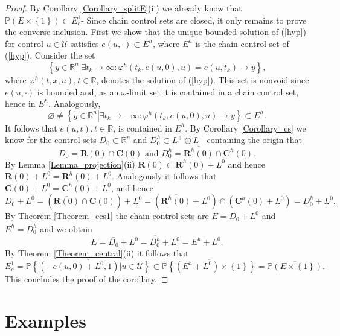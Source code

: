 \documentclass{siamltex}%
\begin{document}
\begin{proof}
By Corollary \ref{Corollary_splitE}(ii) we already know that $\mathbb{P}%
(E\times\left\{  1\right\}  )\subset E_{c}^{1}$- Since chain control sets are
closed, it only remains to prove the converse inclusion. First we show that
the unique bounded solution of (\ref{hyp}) for control $u\in\mathcal{U}$
satisfies $e(u,\cdot)\subset E^{h}$, where $E^{h}$ is the chain control set of
(\ref{hyp}). Consider the set%
\[
\left\{  y\in\mathbb{R}^{n}\left\vert \exists t_{k}\rightarrow\infty
:\varphi^{h}(t_{k},e(u,0),u)=e(u,t_{k})\rightarrow y\right.  \right\}  ,
\]
where $\varphi^{h}(t,x,u),t\in\mathbb{R}$, denotes the solution of
(\ref{hyp}). This set is nonvoid since $e(u,\cdot)$ is bounded and, as an
$\omega$-limit set it is contained in a chain control set, hence in $E^{h}$.
Analogously,%
\[
\varnothing\not =\left\{  y\in\mathbb{R}^{n}\left\vert \exists t_{k}%
\rightarrow-\infty:\varphi^{h}(t_{k},e(u,0),u)\rightarrow y\right.  \right\}
\subset E^{h}.
\]
It follows that $e(u,t),t\in\mathbb{R}$, is contained in $E^{h}$. By Corollary
\ref{Corollary_cs} we know for the control sets $D_{0}\subset\mathbb{R}^{n}$
and $D_{0}^{h}\subset L^{+}\oplus L^{-}$ containing the origin that
\[
D_{0}=\overline{\mathbf{R}(0)}\cap\mathbf{C}(0)\text{ and }D_{0}^{h}%
=\overline{\mathbf{R}^{h}(0)}\cap\mathbf{C}^{h}(0).
\]
By Lemma \ref{Lemma_projection}(ii) $\mathbf{R}(0)\subset\mathbf{R}%
^{h}(0)+L^{0}$ and hence $\mathbf{R}(0)+L^{0}=\mathbf{R}^{h}(0)+L^{0}$.
Analogously it follows that $\mathbf{C}(0)+L^{0}=\mathbf{C}^{h}(0)+L^{0}$, and
hence%
\[
D_{0}+L^{0}=\left(  \overline{\mathbf{R}(0)}\cap\mathbf{C}(0)\right)
+L^{0}=\left(  \overline{\mathbf{R}^{h}(0)}+L^{0}\right)  \cap\left(
\mathbf{C}^{h}(0)+L^{0}\right)  =D_{0}^{h}+L^{0}.
\]
By Theorem \ref{Theorem_ccs1} the chain control sets are $E=\overline{D_{0}%
}+L^{0}$ and $E^{h}=\overline{D_{0}^{h}}$ and we obtain%
\[
E=\overline{D_{0}}+L^{0}=\overline{D_{0}^{h}}+L^{0}=E^{h}+L^{0}.
\]
By Theorem \ref{Theorem_central}(ii) it follows that%
\[
E_{c}^{1}=\overline{\mathbb{P}\left\{  \left(  -e(u,0)+L^{0},1\right)
\left\vert u\in\mathcal{U}\right.  \right\}  }\subset\overline{\mathbb{P}%
\left\{  \left(  E^{h}+L^{0}\right)  \times\left\{  1\right\}  \right\}
}=\overline{\mathbb{P}\left(  E\times\left\{  1\right\}  \right)  }.
\]
This concludes the proof of the corollary.
\end{proof}

\section{Examples\label{Section6}}
\end{document}
